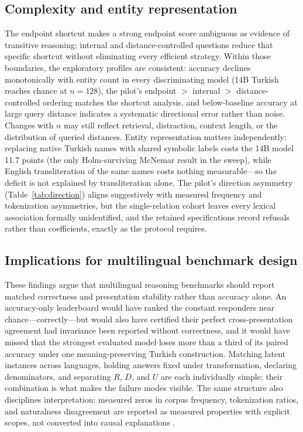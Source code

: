 \subsection{Complexity and entity representation}

The endpoint shortcut makes a strong endpoint score ambiguous as evidence of transitive reasoning;
internal and distance-controlled questions reduce that specific shortcut without eliminating every
efficient strategy. Within those boundaries, the exploratory profiles are consistent: accuracy declines
monotonically with entity count in every discriminating model (14B Turkish reaches chance at $n{=}128$),
the pilot's endpoint $>$ internal $>$ distance-controlled ordering matches the shortcut analysis, and
below-baseline accuracy at large query distance indicates a systematic directional error rather than noise.
Changes with $n$ may still reflect retrieval, distraction, context length, or the distribution of queried
distances. Entity representation matters independently: replacing native Turkish names with shared symbolic
labels costs the 14B model 11.7 points (the only Holm-surviving McNemar result in the sweep), while English
transliteration of the same names costs nothing measurable---so the deficit is not explained by
transliteration alone. The pilot's direction asymmetry (Table~\ref{tab:direction}) aligns suggestively with
measured frequency and tokenization asymmetries, but the single-relation cohort leaves every lexical
association formally unidentified, and the retained specifications record refusals rather than
coefficients, exactly as the protocol requires.

\subsection{Implications for multilingual benchmark design}

These findings argue that multilingual reasoning benchmarks should report matched correctness and
presentation stability rather than accuracy alone. An accuracy-only leaderboard would have ranked the
constant responders near chance---correctly---but would also have certified their perfect cross-presentation
agreement had invariance been reported without correctness, and it would have missed that the strongest
evaluated model loses more than a third of its paired accuracy under one meaning-preserving Turkish
construction. Matching latent instances across languages, holding answers fixed under transformation,
declaring denominators, and separating $R$, $D$, and $U$ are each individually simple; their combination is
what makes the failure modes visible. The same structure also disciplines interpretation: measured zeros in
corpus frequency, tokenization ratios, and naturalness disagreement are reported as measured properties
with explicit scopes, not converted into causal explanations \citep{rust2021tokenizer, ahia2023languages,
petrov2023tokenizers}.

